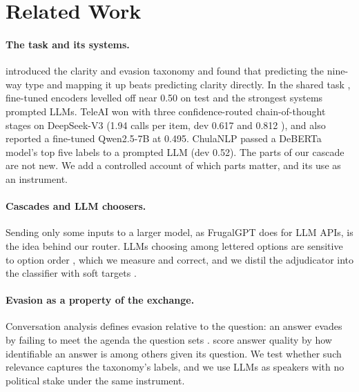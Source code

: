 \section{Related Work}
\label{sec:related}

\paragraph{The task and its systems.}
\citet{thomas-etal-2024-never} introduced the clarity and evasion taxonomy and found that predicting the nine-way type and mapping it up beats predicting clarity directly.
In the shared task \citep{thomas-etal-2026-semeval}, fine-tuned encoders levelled off near 0.50 on test \Stwo{} and the strongest systems prompted LLMs.
TeleAI \citep{shi-etal-2026-teleai} won with three confidence-routed chain-of-thought stages on DeepSeek-V3 (1.94 calls per item, dev 0.617 \Stwo{} and 0.812 \Sone{}), and also reported a fine-tuned Qwen2.5-7B at 0.495.
ChulaNLP \citep{peerachaidecho-rutherford-2026-chulanlp} passed a DeBERTa model's top five labels to a prompted LLM (dev 0.52).
The parts of our cascade are not new. We add a controlled account of which parts matter, and its use as an instrument.

\paragraph{Cascades and LLM choosers.}
Sending only some inputs to a larger model, as FrugalGPT \citep{chen2023frugalgpt} does for LLM APIs, is the idea behind our router.
LLMs choosing among lettered options are sensitive to option order \citep{zheng2024large}, which we measure and correct, and we distil the adjudicator into the classifier with soft targets \citep{hinton2015distilling}.

\paragraph{Evasion as a property of the exchange.}
Conversation analysis defines evasion relative to the question: an answer evades by failing to meet the agenda the question sets \citep{clayman-2001-answers}.
\citet{alvarez-morrier-2025-measuring} score answer quality by how identifiable an answer is among others given its question. We test whether such relevance captures the taxonomy's labels, and we use LLMs as speakers with no political stake under the same instrument.
